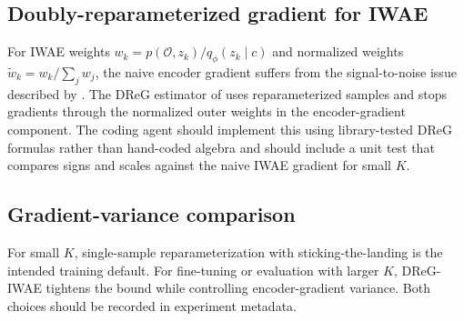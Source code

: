 \subsection*{Doubly-reparameterized gradient for IWAE}
For IWAE weights $w_k=p(\mathcal{O},z_k)/q_\phi(z_k\mid c)$ and normalized weights $\tilde w_k=w_k/\sum_j w_j$, the naive encoder gradient suffers from the signal-to-noise issue described by \citet{rainforth2018iwaeSNR}. The DReG estimator of \citet{tucker2019dreg} uses reparameterized samples and stops gradients through the normalized outer weights in the encoder-gradient component. The coding agent should implement this using library-tested DReG formulas rather than hand-coded algebra and should include a unit test that compares signs and scales against the naive IWAE gradient for small $K$.

\subsection*{Gradient-variance comparison}
For small $K$, single-sample reparameterization with sticking-the-landing is the intended training default. For fine-tuning or evaluation with larger $K$, DReG-IWAE tightens the bound while controlling encoder-gradient variance. Both choices should be recorded in experiment metadata.
